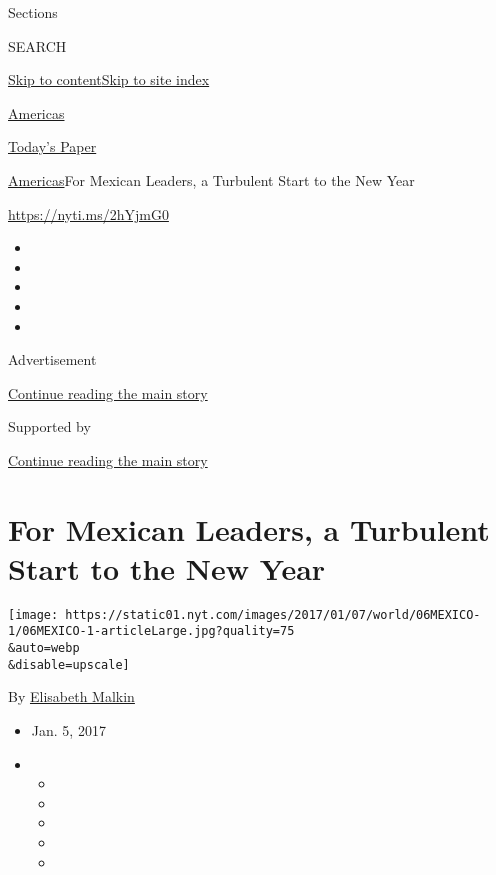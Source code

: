 Sections

SEARCH

\protect\hyperlink{site-content}{Skip to
content}\protect\hyperlink{site-index}{Skip to site index}

\href{https://www.nytimes.com/section/world/americas}{Americas}

\href{https://myaccount.nytimes.com/auth/login?response_type=cookie\&client_id=vi}{}

\href{https://www.nytimes.com/section/todayspaper}{Today's Paper}

\href{/section/world/americas}{Americas}\textbar{}For Mexican Leaders, a
Turbulent Start to the New Year

\url{https://nyti.ms/2hYjmG0}

\begin{itemize}
\item
\item
\item
\item
\item
\end{itemize}

Advertisement

\protect\hyperlink{after-top}{Continue reading the main story}

Supported by

\protect\hyperlink{after-sponsor}{Continue reading the main story}

\hypertarget{for-mexican-leaders-a-turbulent-start-to-the-new-year}{%
\section{For Mexican Leaders, a Turbulent Start to the New
Year}\label{for-mexican-leaders-a-turbulent-start-to-the-new-year}}

\texttt{[image: https://static01.nyt.com/images/2017/01/07/world/06MEXICO-1/06MEXICO-1-articleLarge.jpg?quality=75\\\&auto=webp\\\&disable=upscale]}

By \href{https://www.nytimes.com/by/elisabeth-malkin}{Elisabeth Malkin}

\begin{itemize}
\item
  Jan. 5, 2017
\item
  \begin{itemize}
  \item
  \item
  \item
  \item
  \item
  \end{itemize}
\end{itemize}

